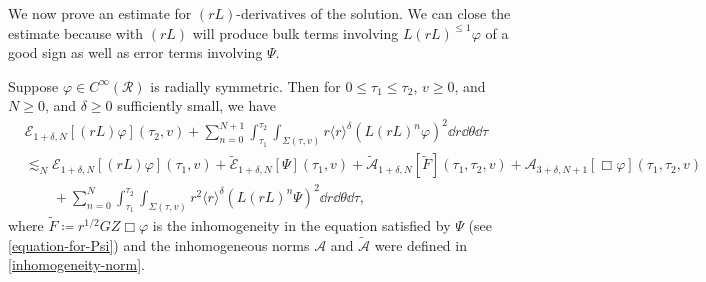 \documentclass[10pt, reqno]{amsart}
\begin{document}
We now prove an estimate for \((rL)\)-derivatives of the solution. We can close
the estimate because with \((rL)\) will produce bulk terms involving \(L(rL)^{\le
1}\varphi{}\) of a good sign as well as error terms involving \(\Psi{}\).
\begin{proposition}
Suppose \(\varphi{}\in C^\infty(\mathcal{R})\) is radially symmetric. Then for \(0\le \tau_1\le \tau_2\),
\(v\ge 0\), and \(N\ge 0\), and \(\delta{}\ge 0\) sufficiently small, we have
\begin{equation}\label{r-estimate-equation}
\begin{split}
&\mathcal{E}_{1+\delta{},N}[(rL)\varphi{}](\tau{}_2,v) + \sum_{n=0}^{N+1}\int_{\tau{}_1}^{\tau{}_2} \int _{\Sigma{}(\tau{},v)} r\langle{}r\rangle^\delta{}(L(rL)^n\varphi{})^2\dd{}r\dd{}\theta{}\dd{}\tau{} \\
&\lesssim_N \mathcal{E}_{1+\delta{},N}[(rL)\varphi{}](\tau{}_1,v) + \tilde{\mathcal{E}}_{1+\delta{},N}[\Psi{}](\tau{}_1,v) + \tilde{\mathcal{A}}_{1+\delta{},N}[\tilde{F}](\tau{}_1,\tau{}_2,v) + \mathcal{A}_{3+\delta{},N+1}[\Box{}\varphi{}](\tau{}_1,\tau{}_2,v)\\
&\qquad + \sum_{n=0}^N \int_{\tau{}_1}^{\tau{}_2} \int _{\Sigma{}(\tau{},v)}r^2\langle{}r\rangle^\delta{}(L(rL)^n\Psi{})^2\dd{}r\dd{}\theta{}\dd{}\tau{},
\end{split}
\end{equation}
where \(\tilde{F} \coloneqq{} r^{1/2}GZ\Box{}\varphi{}\) is the inhomogeneity in the equation
satisfied by \(\Psi{}\) (see \cref{equation-for-Psi}) and the inhomogeneous norms
\(\mathcal{A}\) and \(\tilde{\mathcal{A}}\) were defined in
\cref{inhomogeneity-norm}.
\label{r-estimate}
\end{proposition}
\end{document}
